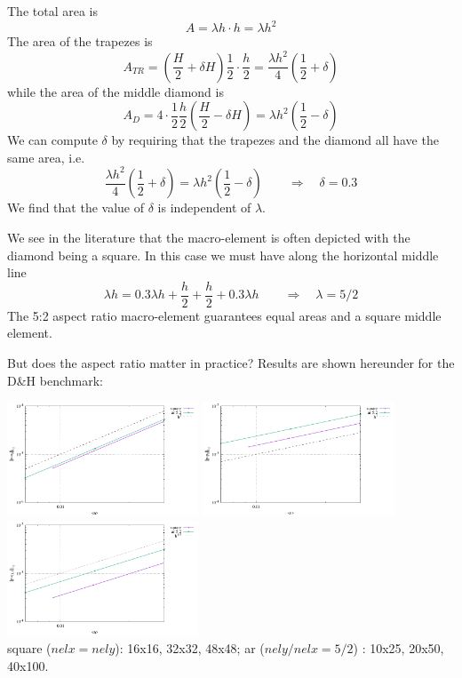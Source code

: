 The total area is 
\[
A= \lambda h \cdot h = \lambda h^2
\]
The area of the trapezes is
\[
A_{TR} = (\frac{H}{2} + \delta H)\frac12 \cdot \frac{h}{2}=\frac{\lambda h^2}{4} \left(\frac12 + \delta \right)
\]
while the area of the middle diamond is
\[
A_D = 4 \cdot \frac12 \frac{h}{2} \left(\frac{H}{2}-\delta H \right) 
= \lambda h^2 \left(\frac12 - \delta \right)
\]
We can compute $\delta$ by requiring that the trapezes and the diamond all 
have the same area, i.e.
\[
\frac{\lambda h^2}{4} (\frac12 + \delta)
=
\lambda h^2 (\frac12 - \delta)
\qquad
\Rightarrow \quad \delta = 0.3
\]
We find that the value of $\delta$ is independent of $\lambda$.

We see in the literature \cite{sten84,brfo,chba93}  that the 
macro-element is often depicted with the diamond being a square.
In this case we must have along the horizontal middle line
\[
\lambda h = 0.3 \lambda h + \frac{h}{2}+ \frac{h}{2} + 0.3 \lambda h
\qquad
\Rightarrow \quad 
\lambda=5/2
\]
The 5:2 aspect ratio macro-element guarantees equal areas and a square middle element.

But does the aspect ratio matter in practice? 
Results are shown hereunder for the D\&H benchmark:

\begin{center}
\includegraphics[width=5.7cm]{python_codes/fieldstone_78/results/exp01/stenberg_study/errors_u.pdf}
\includegraphics[width=5.7cm]{python_codes/fieldstone_78/results/exp01/stenberg_study/errors_p.pdf}
\includegraphics[width=5.7cm]{python_codes/fieldstone_78/results/exp01/stenberg_study/errors_q1.pdf}\\
{\captionfont square ($nelx=nely$): 16x16, 32x32, 48x48; 
ar ($nely/nelx=5/2$) : 10x25, 20x50, 40x100.}
\end{center}

